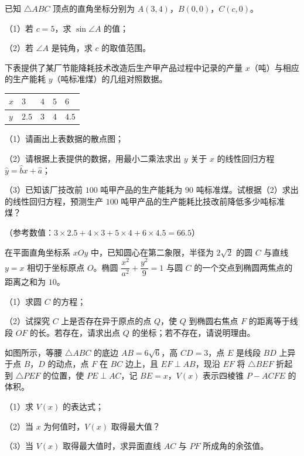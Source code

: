 \begin{question}
已知 $\triangle ABC$ 顶点的直角坐标分别为 $A(3,4)$，$B(0,0)$，$C(c,0)$。

（1）若 $c=5$，求 $\sin\angle A$ 的值；

（2）若 $\angle A$ 是钝角，求 $c$ 的取值范围。

\end{question}
\begin{question}
下表提供了某厂节能降耗技术改造后生产甲产品过程中记录的产量 $x$（吨）与相应的生产能耗 $y$（吨标准煤）的几组对照数据。

\begin{center}
\begin{tabular}{lllll}
\toprule
$x$ & $3$ & $4$ & $5$ & $6$ \\
\midrule
$y$ & $2.5$ & $3$ & $4$ & $4.5$ \\
\bottomrule
\end{tabular}
\end{center}

（1）请画出上表数据的散点图；

（2）请根据上表提供的数据，用最小二乘法求出 $y$ 关于 $x$ 的线性回归方程 $\hat y=\hat b x+\hat a$；

（3）已知该厂技改前 $100$ 吨甲产品的生产能耗为 $90$ 吨标准煤。试根据（2）求出的线性回归方程，预测生产 $100$ 吨甲产品的生产能耗比技改前降低多少吨标准煤？

（参考数值：$3\times2.5+4\times3+5\times4+6\times4.5=66.5$）

\end{question}
\begin{question}
在平面直角坐标系 $xOy$ 中，已知圆心在第二象限，半径为 $2\sqrt2$ 的圆 $C$ 与直线 $y=x$ 相切于坐标原点 $O$。椭圆 $\dfrac{x^2}{a^2}+\dfrac{y^2}{9}=1$ 与圆 $C$ 的一个交点到椭圆两焦点的距离之和为 $10$。

（1）求圆 $C$ 的方程；

（2）试探究 $C$ 上是否存在异于原点的点 $Q$，使 $Q$ 到椭圆右焦点 $F$ 的距离等于线段 $OF$ 的长。若存在，请求出点 $Q$ 的坐标；若不存在，请说明理由。

\Needspace{0.4\textheight}
\end{question}
\begin{question}
如图所示，等腰 $\triangle ABC$ 的底边 $AB=6\sqrt6$，高 $CD=3$，点 $E$ 是线段 $BD$ 上异于点 $B$，$D$ 的动点，点 $F$ 在 $BC$ 边上，且 $EF\perp AB$，现沿 $EF$ 将 $\triangle BEF$ 折起到 $\triangle PEF$ 的位置，使 $PE\perp AC$，记 $BE=x$，$V(x)$ 表示四棱锥 $P-ACFE$ 的体积。

（1）求 $V(x)$ 的表达式；

（2）当 $x$ 为何值时，$V(x)$ 取得最大值？

（3）当 $V(x)$ 取得最大值时，求异面直线 $AC$ 与 $PF$ 所成角的余弦值。
\nopagebreak[4]
\begin{center}\end{center}
\nopagebreak[4]
\end{question}
